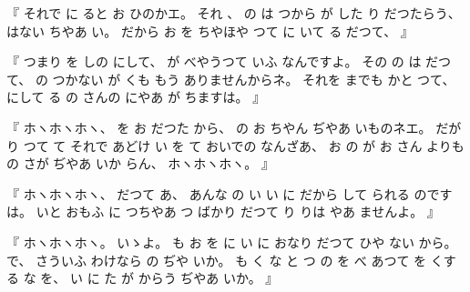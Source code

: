%
『
それで
に
ると
お
ひのかエ。
%
それ
、
%
の
は
つから
が
した
り
だつたらう、
%
はない
ちやあ
い。
%
だから
お
を
ちやほや
つて
に
いて
る
だつて、
』

%
『
つまり
を
しの
にして、
%
が
べやうつて
いふ
なんですよ。
%
その
の
は
だつて、
%
の
つかない
が
くも%
%
もう
ありませんからネ。
%
それを
までも
かと
つて、
%
にして
る
の
さんの
にやあ
が
ちますは。
』

%
『
ホヽホヽホヽ、
%
を
お
だつた
から、
%
の
お
ちやん
ぢやあ
いものネエ。
%
だが
り
つて
て
それで
あどけ
い
を
て
おいでの
なんざあ、
%
お
の
が
お
さん
よりも
の
さが
ぢやあ
いか
らん、
%
ホヽホヽホヽ。
』

%
『
ホヽホヽホヽ、
%
だつて
あ、
%
あんな
の
い
い
に
だから
して
られる
のですは。
%
いと
おもふ
に
つちやあ
つ
ばかり
だつて
り
りは
やあ
ませんよ。
』

%
『
ホヽホヽホヽ。
%
いゝよ。
%
も
お
を
に
い
に
おなり
だつて
ひや
ない
から。
%
で、
%
さういふ
わけなら
の
ぢや
いか。
%
も
く
な
と
つ
の
を
べ
あつて
を
くする
な
を、
%
い
に
た
が
からう
ぢやあ
いか。
』

